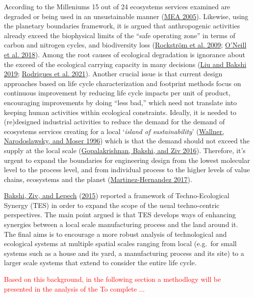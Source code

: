 \documentclass[
]{article}
\begin{document}
According to the Milleniums 15 out of 24 ecosystems services examined are degraded or being used in an unsustainable manner (\protect\hyperlink{ref-MEA2005}{MEA 2005}).
Likewise, using the planetary boundaries framework, it is argued that anthropogenic activities already exceed the biophysical limits of the ``safe operating zone'' in terms of carbon and nitrogen cycles, and biodiversity loss (\protect\hyperlink{ref-Rockstrom2009}{Rockström et al. 2009}; \protect\hyperlink{ref-ONeill2018}{O'Neill et al. 2018}).
Among the root causes of ecological degradation is ignorance about the exceed of the ecological carrying capacity in many decisions (\protect\hyperlink{ref-Liu2019g}{Liu and Bakshi 2019}; \protect\hyperlink{ref-Rodrigues2021}{Rodrigues et al. 2021}).
Another crucial issue is that current design approaches based on life cycle characterization and footprint methods focus on continuous improvement by reducing life cycle impacts per unit of product, encouraging improvements by doing ``less bad,'' which need not translate into keeping human activities within ecological constraints.
Ideally, it is needed to (re)designed industrial activities to reduce the demand for the demand of ecosystems services creating for a local `\emph{island of sustainability}' (\protect\hyperlink{ref-Wallner1996}{Wallner, Narodoslawsky, and Moser 1996}) which is that the demand should not exceed the supply at the local scale (\protect\hyperlink{ref-Gopalakrishnan2016}{Gopalakrishnan, Bakshi, and Ziv 2016}).
Therefore, it's urgent to expand the boundaries for engineering design from the lowest molecular level to the process level, and from individual process to the higher levels of value chains, ecosystems and the planet (\protect\hyperlink{ref-Martinez-Hernandez2017}{Martinez-Hernandez 2017}).

\protect\hyperlink{ref-Bakshi2015}{Bakshi, Ziv, and Lepech} (\protect\hyperlink{ref-Bakshi2015}{2015}) reported a framework of Techno-Ecological Synergy (TES) in order to expand the scope of the usual techno-centric perspectives.
The main point argued is that TES develops ways of enhancing synergies between a local scale manufacturing process and the land around it.
The final aims is to encourage a more robust analysis of technological and ecological systems at multiple spatial scales ranging from local (e.g.~for small systems such as a house and its yard, a manufacturing process and its site) to a larger scale systems that extend to consider the entire life cycle.

\textcolor{red}{
Based on this background, in the following section a methodlogy will be presented in the analysis of the  To complete ...}
\end{document}

